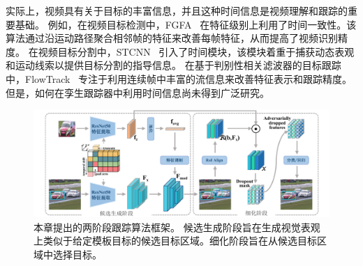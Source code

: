 实际上，视频具有关于目标的丰富信息，并且这种时间信息是视频理解和跟踪的重要基础。
例如，在视频目标检测中，FGFA~\cite{zhu2017flow} 在特征级别上利用了时间一致性。该算法通过沿运动路径聚合相邻帧的特征来改善每帧特征，从而提高了视频识别精度。
在视频目标分割中，STCNN~\cite{xu2019spatiotemporal} 引入了时间模块，该模块着重于捕获动态表观和运动线索以提供目标分割的指导信息。
在基于判别性相关滤波器的目标跟踪中，FlowTrack~\cite{zhu2018end} 专注于利用连续帧中丰富的流信息来改善特征表示和跟踪精度。
但是，如何在孪生跟踪器中利用时间信息尚未得到广泛研究。

\begin{figure}[t]
    \centering
    \includegraphics[width=1.0\textwidth]{Img/end/net_v3.pdf}
    \caption{
    本章提出的两阶段跟踪算法框架。
    候选生成阶段旨在生成视觉表观上类似于给定模板目标的候选目标区域。细化阶段旨在从候选目标区域中选择目标。}
    \label{fig:SiamTFA}
\end{figure}

